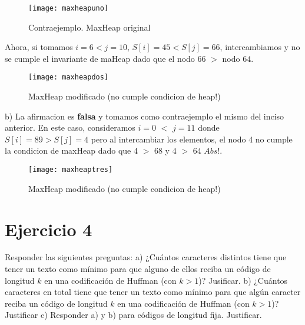 \documentclass[10pt,a4paper]{article}
\begin{document}
\begin{figure}[h]
	\centering
	\texttt{[image: maxheapuno]}
	\caption{Contraejemplo. MaxHeap original}
	\label{drivers1}
\end{figure}

Ahora, si tomamos $i = 6 < j = 10$, $S[i] = 45 < S[j] = 66$, intercambiamos y no se cumple el invariante de maHeap dado que el nodo 66 $>$ nodo $64$.

\begin{figure}[h]
	\centering
	\texttt{[image: maxheapdos]}
	\caption{MaxHeap modificado (no cumple condicion de heap!)}
	\label{drivers1}
\end{figure}
\newpage

b) La afirmacion es \textbf{falsa} y tomamos como contraejemplo el mismo del inciso anterior. 
\newline
\newline
En este caso, consideramos $i = 0$ $<$ $j=11$ donde $S[i] = 89 > S[j] = 4$ pero al intercambiar los elementos, el nodo 4 no cumple la condicion de maxHeap dado que $4$ $>$ $68$ y $4$ $>$ $64$ $Abs!$.

\begin{figure}[h]
	\centering
	\texttt{[image: maxheaptres]}
	\caption{MaxHeap modificado (no cumple condicion de heap!)}
	\label{drivers1}
\end{figure}
\newpage

\section{Ejercicio 4}

Responder las siguientes preguntas:
\newline
\newline
a) ¿Cuántos caracteres distintos tiene que tener un texto como mínimo para que alguno de ellos reciba un código de longitud $k$ en una codificación de Huffman (con $k > 1$)? Jusificar.
\newline
\newline
b) ¿Cuántos caracteres en total tiene que tener un texto como mínimo para que algún caracter reciba un código de longitud $k$ en una codificación de Huffman (con $k > 1$)? Justificar
\newline
\newline
c) Responder a) y b) para códigos de longitud fija. Justificar.
\newpage
\end{document}
